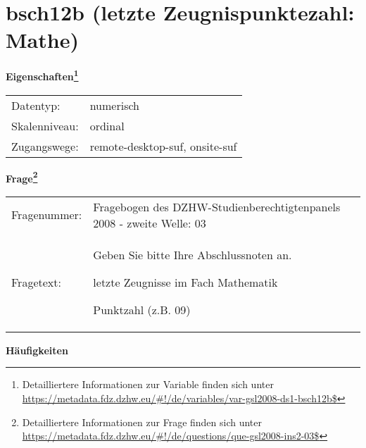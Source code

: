 
    \setcounter{footnote}{0}

    \vspace*{-1.8cm}
	\section{bsch12b (letzte Zeugnispunktezahl: Mathe)}
	\label{section:bsch12b}



    \vspace*{0.5cm}
    \noindent\textbf{Eigenschaften\footnote{Detailliertere Informationen zur Variable finden sich unter
		\url{https://metadata.fdz.dzhw.eu/\#!/de/variables/var-gsl2008-ds1-bsch12b$}}}\\
	\begin{tabularx}{\hsize}{@{}lX}
	Datentyp: & numerisch \\
	Skalenniveau: & ordinal \\
	Zugangswege: &
	  remote-desktop-suf, 
	  onsite-suf
 \\
    \end{tabularx}



				\vspace*{0.5cm}
                \noindent\textbf{Frage\footnote{Detailliertere Informationen zur Frage finden sich unter
		              \url{https://metadata.fdz.dzhw.eu/\#!/de/questions/que-gsl2008-ins2-03$}}}\\
				\begin{tabularx}{\hsize}{@{}lX}
					Fragenummer: &
					  Fragebogen des DZHW-Studienberechtigtenpanels 2008 - zweite Welle:
					  03
 \\
					Fragetext: & Geben Sie bitte Ihre Abschlussnoten an.\par  letzte Zeugnisse im Fach Mathematik\par  Punktzahl (z.B. 09) \\
				\end{tabularx}





        		\vspace*{0.5cm}
                \noindent\textbf{Häufigkeiten}

